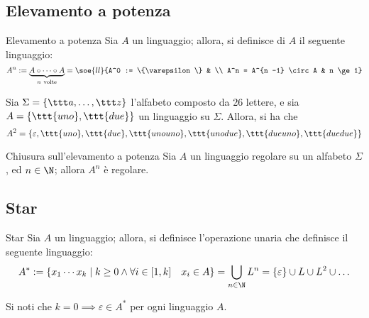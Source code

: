 \documentclass[a4paper, 12pt]{report}
\begin{document}
    \subsection{Elevamento a potenza}

    \begin{frameddefn}{Elevamento a potenza}
        Sia $A$ un linguaggio; allora, si definisce  di $A$ il seguente linguaggio: $$A^n := \underbrace{A \circ \cdots \circ A}_{n \ \textrm{volte}} = \soe{ll}{A^0 := \{\varepsilon \} & \\ A^n = A^{n -1} \circ A & n \ge 1}$$
    \end{frameddefn}

    \begin{example}
        Sia $\Sigma = \{\ttt a , \ldots, \ttt z\}$ l'alfabeto composto da 26 lettere, e sia $A = \{\ttt{uno}, \ttt{due}\}$ un linguaggio su $\Sigma$. Allora, si ha che $$A^2 = \{\varepsilon, \ttt{uno}, \ttt{due}, \ttt{unouno}, \ttt{unodue}, \ttt{dueuno}, \ttt{duedue}\}$$
    \end{example}

    \begin{framedprop}{Chiusura sull'elevamento a potenza}
        Sia $A$ un linguaggio regolare su un alfabeto $\Sigma$, ed $n \in \N$; allora $A^n$ è regolare.
    \end{framedprop}


    \subsection{Star}

    \begin{frameddefn}{Star}
        Sia $A$ un linguaggio; allora, si definisce l'operazione unaria  che definisce il seguente linguaggio: $$A^* := \{x_1 \cdots x_k \mid k \ge 0 \land \forall i \in [1, k] \quad x_i \in A\} = \displaystyle \bigcup_{n \in \N}{L^n}=\{ \varepsilon \} \cup L \cup L^2 \cup \ldots$$

        Si noti che $k = 0 \implies \varepsilon \in A^*$ per ogni linguaggio $A$.
    \end{frameddefn}
\end{document}
